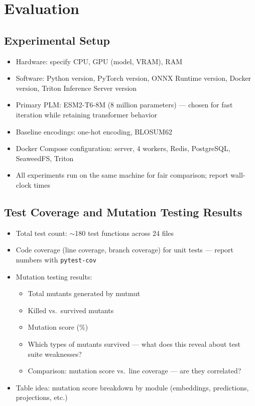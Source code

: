 
\chapter{Evaluation}\label{chapter:evaluation}


\section{Experimental Setup}\label{sec:eval-setup}
\begin{itemize}
  \item Hardware: specify CPU, GPU (model, VRAM), RAM
  \item Software: Python version, PyTorch version, ONNX Runtime version, Docker version, Triton Inference Server version
  \item Primary PLM: ESM2-T6-8M (8 million parameters) --- chosen for fast iteration while retaining transformer behavior
  \item Baseline encodings: one-hot encoding, BLOSUM62
  \item Docker Compose configuration: server, 4 workers, Redis, PostgreSQL, SeaweedFS, Triton
  \item All experiments run on the same machine for fair comparison; report wall-clock times
\end{itemize}

\section{Test Coverage and Mutation Testing Results}\label{sec:eval-mutation}
\begin{itemize}
  \item Total test count: $\sim$180 test functions across 24 files
  \item Code coverage (line coverage, branch coverage) for unit tests --- report numbers with \texttt{pytest-cov}
  \item Mutation testing results:
    \begin{itemize}
      \item Total mutants generated by mutmut
      \item Killed vs.\ survived mutants
      \item Mutation score (\%)
      \item Which types of mutants survived --- what does this reveal about test suite weaknesses?
      \item Comparison: mutation score vs.\ line coverage --- are they correlated?
    \end{itemize}
  \item Table idea: mutation score breakdown by module (embeddings, predictions, projections, etc.)
\end{itemize}

